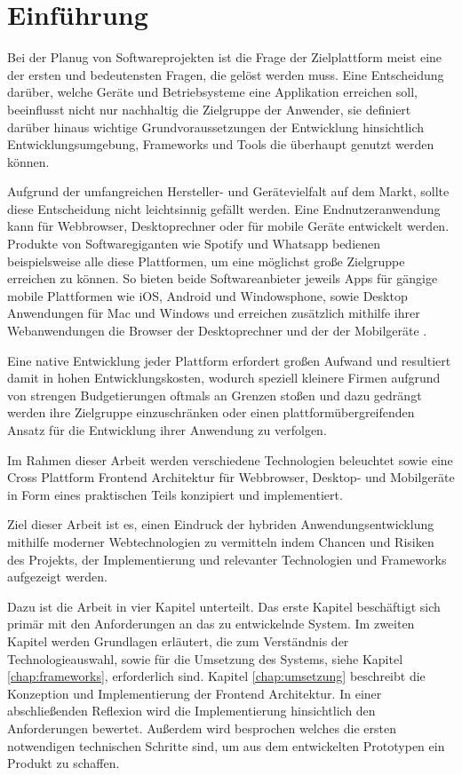 
\chapter{Einführung}
\label{chap:introduction}

Bei der Planug von Softwareprojekten ist die Frage der Zielplattform meist eine der ersten und bedeutensten Fragen,
die gelöst werden muss. Eine Entscheidung darüber, welche Geräte und Betriebsysteme eine Applikation erreichen soll,
beeinflusst nicht nur nachhaltig die Zielgruppe der Anwender, sie definiert darüber hinaus wichtige Grundvoraussetzungen der Entwicklung hinsichtlich Entwicklungsumgebung, Frameworks und Tools die überhaupt genutzt werden können.

Aufgrund der umfangreichen Hersteller- und Gerätevielfalt auf dem Markt, sollte diese Entscheidung nicht leichtsinnig gefällt werden.
Eine Endnutzeranwendung kann für Webbrowser, Desktoprechner oder für mobile Geräte entwickelt werden.
Produkte von Softwaregiganten wie Spotify und Whatsapp bedienen beispielsweise alle diese Plattformen, um eine möglichst große Zielgruppe erreichen zu können.
So bieten beide Softwareanbieter jeweils Apps für gängige mobile Plattformen wie iOS, Android und Windowsphone,
sowie Desktop Anwendungen für Mac und Windows und erreichen zusätzlich mithilfe ihrer Webanwendungen die Browser der Desktoprechner
und der der Mobilgeräte \cite{Spoti93:online} \cite{Whats74:online} \cite{Whats6:online}.

Eine native Entwicklung jeder Plattform erfordert großen Aufwand und resultiert damit in hohen
Entwicklungskosten, wodurch speziell kleinere Firmen aufgrund von strengen Budgetierungen oftmals
an Grenzen stoßen und
dazu gedrängt werden ihre Zielgruppe einzuschränken oder einen plattformübergreifenden Ansatz für
die Entwicklung ihrer Anwendung zu verfolgen.

Im Rahmen dieser Arbeit werden verschiedene Technologien beleuchtet sowie eine
Cross Plattform Frontend Architektur für Webbrowser, Desktop- und Mobilgeräte in Form eines praktischen Teils
konzipiert und implementiert.

Ziel dieser Arbeit ist es, einen Eindruck der hybriden Anwendungsentwicklung mithilfe moderner
Webtechnologien zu vermitteln indem Chancen und Risiken des Projekts, der Implementierung und relevanter Technologien und Frameworks aufgezeigt werden.

\vspace{0.6cm}

\noindent
Dazu ist die Arbeit in vier Kapitel unterteilt. Das erste Kapitel beschäftigt sich primär mit den
Anforderungen an das zu entwickelnde System.
Im zweiten Kapitel werden Grundlagen erläutert, die zum Verständnis der Technologieauswahl,
sowie für die Umsetzung des Systems, siehe Kapitel \ref{chap:frameworks}, erforderlich sind.
Kapitel \ref{chap:umsetzung} beschreibt die Konzeption und Implementierung der Frontend Architektur.
In einer abschließenden Reflexion wird die Implementierung hinsichtlich den Anforderungen bewertet.
Außerdem wird besprochen welches die ersten notwendigen technischen Schritte sind, um aus dem entwickelten Prototypen ein Produkt zu schaffen.
